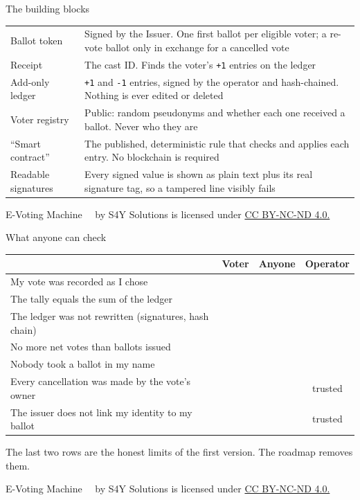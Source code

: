 \documentclass[11pt,aspectratio=169]{beamer}
\newcommand{\currentyear}{\the\year}
\newcommand{\copyrightnote}{
    \vfill
    \begin{flushleft}
    \tiny
    E-Voting Machine \textcopyright~\currentyear~by S4Y Solutions is licensed under
    \href{https://creativecommons.org/licenses/by-nc-nd/4.0}{CC BY-NC-ND 4.0.}
    \end{flushleft}
}
\newcommand{\yes}{\textcolor{ok}{\ding{51}}}
\newcommand{\trusted}{\textcolor{warn}{trusted}}
\begin{document}
\begin{frame}{The building blocks}
    \small
    \renewcommand{\arraystretch}{1.25}
    \begin{tabular}{B{0.22\textwidth}L{0.7\textwidth}}
        \toprule
        Ballot token & Signed by the Issuer. One first ballot per eligible voter; a re-vote ballot only in exchange for a cancelled vote \\
        Receipt & The cast ID. Finds the voter's \texttt{+1} entries on the ledger \\
        Add-only ledger & \texttt{+1} and \texttt{-1} entries, signed by the operator and hash-chained. Nothing is ever edited or deleted \\
        Voter registry & Public: random pseudonyms and whether each one received a ballot. Never who they are \\
        ``Smart contract'' & The published, deterministic rule that checks and applies each entry. No blockchain is required \\
        Readable signatures & Every signed value is shown as plain text plus its real signature tag, so a tampered line visibly fails \\
        \bottomrule
    \end{tabular}
    \copyrightnote
\end{frame}

\begin{frame}{What anyone can check}
    \small
    \renewcommand{\arraystretch}{1.2}
    \begin{tabular}{L{0.62\textwidth}ccc}
        \toprule
        & \textbf{Voter} & \textbf{Anyone} & \textbf{Operator} \\
        \midrule
        My vote was recorded as I chose & \yes & & \\
        The tally equals the sum of the ledger & \yes & \yes & \\
        The ledger was not rewritten (signatures, hash chain) & \yes & \yes & \\
        No more net votes than ballots issued & \yes & \yes & \\
        Nobody took a ballot in my name & \yes & & \\
        \midrule
        Every cancellation was made by the vote's owner & & & \trusted \\
        The issuer does not link my identity to my ballot & & & \trusted \\
        \bottomrule
    \end{tabular}

    \medskip
    \footnotesize The last two rows are the honest limits of the first version. The roadmap removes them.
    \copyrightnote
\end{frame}
\end{document}
